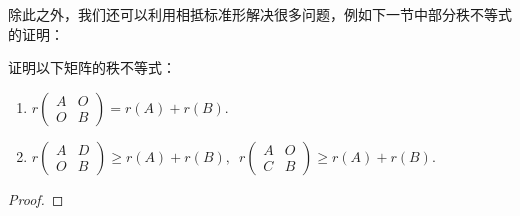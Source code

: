除此之外，我们还可以利用相抵标准形解决很多问题，例如下一节中部分秩不等式的证明：
\begin{example}\label{ex:11:分块秩不等式}
    证明以下矩阵的秩不等式：
    \begin{enumerate}
        \item $r\begin{pmatrix}
            A & O \\ O & B
        \end{pmatrix}=r(A)+r(B)$.

        \item $r\begin{pmatrix}
            A & D \\ O & B
        \end{pmatrix}\geqslant r(A)+r(B),\enspace r\begin{pmatrix}
            A & O \\ C & B
        \end{pmatrix}\geqslant r(A)+r(B)$.
    \end{enumerate}
\end{example}
\begin{proof}

\end{proof}

